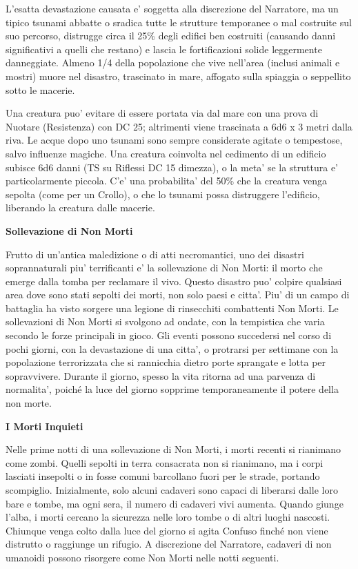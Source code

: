 \documentclass[a4paper,11pt,twoside,openany]{dndbook}
\begin{document}
{L'esatta devastazione causata e' soggetta alla discrezione del Narratore, ma un tipico tsunami abbatte o sradica tutte le strutture temporanee o mal costruite sul suo percorso, distrugge circa il 25\% degli edifici ben costruiti (causando danni significativi a quelli che restano) e lascia le fortificazioni solide leggermente danneggiate. Almeno 1/4 della popolazione che vive nell'area (inclusi animali e mostri) muore nel disastro, trascinato in mare, affogato sulla spiaggia o seppellito sotto le macerie.

Una creatura puo' evitare di essere portata via dal mare con una prova di Nuotare (Resistenza) con DC 25; altrimenti viene trascinata a 6d6 x 3 metri dalla riva. Le acque dopo uno tsunami sono sempre considerate agitate o tempestose, salvo influenze magiche. Una creatura coinvolta nel cedimento di un edificio subisce 6d6 danni (TS su Riflessi DC 15 dimezza), o la meta' se la struttura e' particolarmente piccola. C'e' una probabilita' del 50\% che la creatura venga sepolta (come per un Crollo), o che lo tsunami possa distruggere l'edificio, liberando la creatura dalle macerie.

\textbf{Sollevazione di Non Morti}

Frutto di un'antica maledizione o di atti necromantici, uno dei disastri soprannaturali piu' terrificanti e' la sollevazione di Non Morti: il morto che emerge dal­la tomba per reclamare il vivo. Questo disastro puo' colpire qualsiasi area dove sono stati sepolti dei morti, non solo paesi e citta'. Piu' di un campo di battaglia ha visto sorgere una legione di rinsecchiti combattenti Non Morti. Le sollevazioni di Non Morti si svolgono ad ondate, con la tempistica che varia secondo le forze principali in gioco. Gli eventi possono succedersi nel corso di pochi giorni, con la devastazione di una citta', o protrarsi per settimane con la popolazione terrorizzata che si rannicchia dietro porte sprangate e lotta per sopravvivere. Durante il giorno, spesso la vita ritorna ad una parvenza di normalita', poiché la luce del giorno sopprime temporaneamente il potere della non morte.

\textbf{I Morti Inquieti}

Nelle prime notti di una sollevazione di Non Morti, i morti recenti si rianimano come zombi. Quelli sepolti in terra consacrata non si rianimano, ma i corpi lasciati insepolti o in fosse comuni barcollano fuori per le strade, portando scompiglio. Inizialmente, solo alcuni cadaveri sono capaci di liberarsi dal­le loro bare e tombe, ma ogni sera, il numero di cadaveri vivi aumenta. Quando giunge l'alba, i morti cercano la sicurezza nelle loro tombe o di altri luoghi nascosti. Chiunque venga colto dalla luce del giorno si agita Confuso finché non viene distrutto o raggiunge un rifugio. A discrezione del Narratore, cadaveri di non umanoidi possono risorgere come Non Morti nelle notti seguenti.

}
\end{document}
